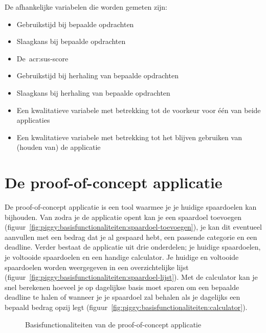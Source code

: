 De afhankelijke variabelen die worden gemeten zijn:
\begin{itemize}
    \item Gebruikstijd bij bepaalde opdrachten
    \item Slaagkans bij bepaalde opdrachten
    \item De~\acrshort{acr:sus}-score
    \item Gebruikstijd bij herhaling van bepaalde opdrachten
    \item Slaagkans bij herhaling van bepaalde opdrachten
    \item Een kwalitatieve variabele met betrekking tot de voorkeur voor één van beide applicaties
    \item Een kwalitatieve variabele met betrekking tot het blijven gebruiken van (houden van) de applicatie
\end{itemize}

\section{De proof-of-concept applicatie}
\label{sec:applicatie}

De proof-of-concept applicatie is een tool waarmee je je huidige spaardoelen kan bijhouden. Van zodra je de applicatie opent kan je een spaardoel toevoegen (figuur~\ref{fig:piggy:basisfunctionaliteiten:spaardoel-toevoegen}), je kan dit eventueel aanvullen met een bedrag dat je al gespaard hebt, een passende categorie en een deadline. Verder bestaat de applicatie uit drie onderdelen; je huidige spaardoelen, je voltooide spaardoelen en een handige calculator. Je huidige en voltooide spaardoelen worden weergegeven in een overzichtelijke lijst (figuur~\ref{fig:piggy:basisfunctionaliteiten:spaardoel-lijst}). Met de calculator kan je snel berekenen hoeveel je op dagelijkse basis moet sparen om een bepaalde deadline te halen of wanneer je je spaardoel zal behalen als je dagelijks een bepaald bedrag opzij legt (figuur~\ref{fig:piggy:basisfunctionaliteiten:calculator}).

\begin{figure}[h!]
    \centering
    \qquad
    \qquad
    \caption{Basisfunctionaliteiten van de proof-of-concept applicatie}
    \label{fig:piggy:basisfunctionaliteiten}
\end{figure}

